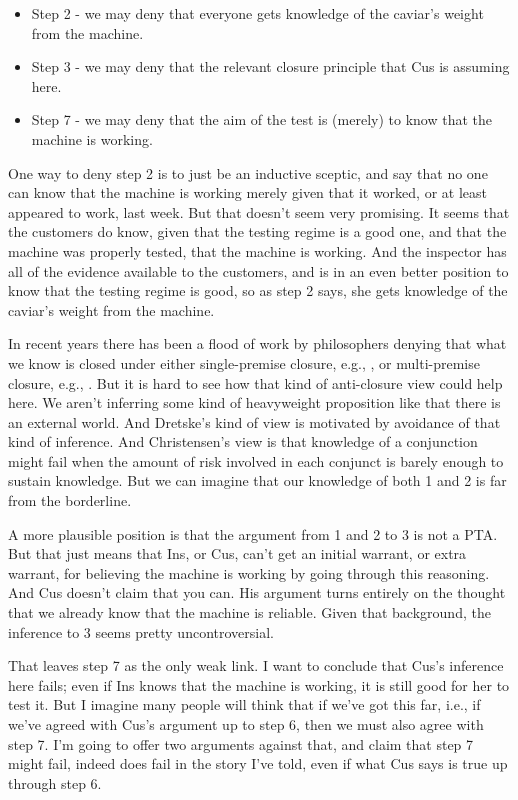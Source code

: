\begin{itemize}
\item{} Step 2 - we may deny that everyone gets knowledge of the caviar's weight from the machine.

\item{} Step 3 - we may deny that the relevant closure principle that \gls{Cus} is assuming here.

\item{} Step 7 - we may deny that the aim of the test is (merely) to know that the machine is working.

\end{itemize}
One way to deny step 2 is to just be an inductive sceptic, and say that no one can know that the machine is working merely given that it worked, or at least appeared to work, last week. But that doesn't seem very promising. It seems that the customers do know, given that the testing regime is a good one, and that the machine was properly tested, that the machine is working. And the inspector has all of the evidence available to the customers, and is in an even better position to know that the testing regime is good, so as step 2 says, she gets knowledge of the caviar's weight from the machine.

In recent years there has been a flood of work by philosophers denying that what we know is closed under either single-premise closure, e.g., \citet{Dretske2005}, or multi-premise closure, e.g., \citet{Christensen2005}. But it is hard to see how that kind of anti-closure view could help here. We aren't inferring some kind of heavyweight proposition like that there is an external world. And Dretske's kind of view is motivated by avoidance of that kind of inference. And Christensen's view is that knowledge of a conjunction might fail when the amount of risk involved in each conjunct is barely enough to sustain knowledge. But we can imagine that our knowledge of both 1 and 2 is far from the borderline.

A more plausible position is that the argument from 1 and 2 to 3 is not a PTA. But that just means that \gls{Ins}, or \gls{Cus}, can't get an initial warrant, or extra warrant, for believing the machine is working by going through this reasoning. And \gls{Cus} doesn't claim that you can. His argument turns entirely on the thought that we already know that the machine is reliable. Given that background, the inference to 3 seems pretty uncontroversial.

That leaves step 7 as the only weak link. I want to conclude that \gls{Cus}'s inference here fails; even if \gls{Ins} knows that the machine is working, it is still good for her to test it. But I imagine many people will think that if we've got this far, i.e., if we've agreed with \gls{Cus}'s argument up to step 6, then we must also agree with step 7. I'm going to offer two arguments against that, and claim that step 7 might fail, indeed does fail in the story I've told, even if what \gls{Cus} says is true up through step 6.

